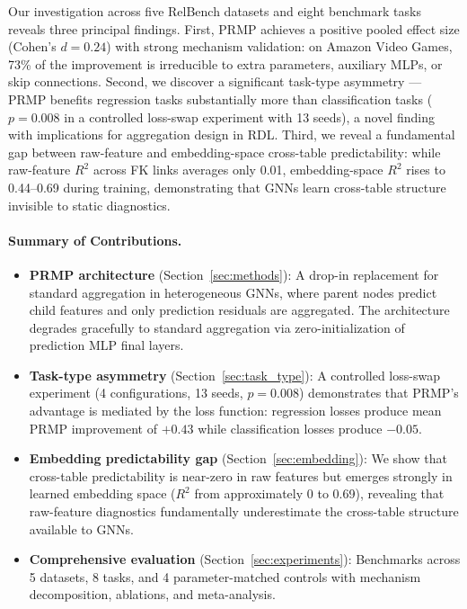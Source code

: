 \documentclass[11pt,letterpaper]{article}
\begin{document}
Our investigation across five RelBench datasets and eight benchmark tasks reveals three principal findings. First, PRMP achieves a positive pooled effect size (Cohen's $d = 0.24$) with strong mechanism validation: on Amazon Video Games, 73\% of the improvement is irreducible to extra parameters, auxiliary MLPs, or skip connections. Second, we discover a significant task-type asymmetry --- PRMP benefits regression tasks substantially more than classification tasks ($p = 0.008$ in a controlled loss-swap experiment with 13 seeds), a novel finding with implications for aggregation design in RDL. Third, we reveal a fundamental gap between raw-feature and embedding-space cross-table predictability: while raw-feature $R^2$ across FK links averages only 0.01, embedding-space $R^2$ rises to 0.44--0.69 during training, demonstrating that GNNs learn cross-table structure invisible to static diagnostics.

\paragraph{Summary of Contributions.}
\begin{itemize}
  \item \textbf{PRMP architecture} (Section~\ref{sec:methods}): A drop-in replacement for standard aggregation in heterogeneous GNNs, where parent nodes predict child features and only prediction residuals are aggregated. The architecture degrades gracefully to standard aggregation via zero-initialization of prediction MLP final layers.

  \item \textbf{Task-type asymmetry} (Section~\ref{sec:task_type}): A controlled loss-swap experiment (4 configurations, 13 seeds, $p = 0.008$) demonstrates that PRMP's advantage is mediated by the loss function: regression losses produce mean PRMP improvement of $+0.43$ while classification losses produce $-0.05$.

  \item \textbf{Embedding predictability gap} (Section~\ref{sec:embedding}): We show that cross-table predictability is near-zero in raw features but emerges strongly in learned embedding space ($R^2$ from approximately 0 to 0.69), revealing that raw-feature diagnostics fundamentally underestimate the cross-table structure available to GNNs.

  \item \textbf{Comprehensive evaluation} (Section~\ref{sec:experiments}): Benchmarks across 5 datasets, 8 tasks, and 4 parameter-matched controls with mechanism decomposition, ablations, and meta-analysis.
\end{itemize}
\end{document}
